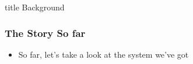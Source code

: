 \documentclass{beamer}
\begin{document}
    		\begin{frame}
                \vfill
                \centering
                \begin{beamercolorbox}[sep=8pt,center,shadow=true,rounded=true]{title}
                    Background\par%
                \end{beamercolorbox}
                \vfill
             \end{frame}
    		
    		
    		\begin{frame}
    			\frametitle{The Story So far}
    			\begin{itemize}
    				\item So far, let's take a look at the system we've got
    				
    			\end{itemize}
    		\end{frame}
    		
\end{document}
